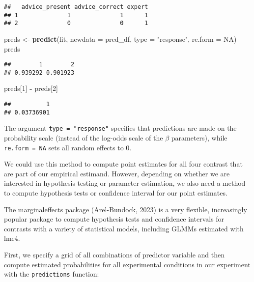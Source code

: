 \documentclass[
  man,floatsintext]{apa6}
\newenvironment{Shaded}{\begin{snugshade}}{\end{snugshade}}
\newcommand{\AttributeTok}[1]{\textcolor[rgb]{0.13,0.29,0.53}{#1}}
\newcommand{\ConstantTok}[1]{\textcolor[rgb]{0.56,0.35,0.01}{#1}}
\newcommand{\DecValTok}[1]{\textcolor[rgb]{0.00,0.00,0.81}{#1}}
\newcommand{\FunctionTok}[1]{\textcolor[rgb]{0.13,0.29,0.53}{\textbf{#1}}}
\newcommand{\NormalTok}[1]{#1}
\newcommand{\OtherTok}[1]{\textcolor[rgb]{0.56,0.35,0.01}{#1}}
\newcommand{\SpecialCharTok}[1]{\textcolor[rgb]{0.81,0.36,0.00}{\textbf{#1}}}
\newcommand{\StringTok}[1]{\textcolor[rgb]{0.31,0.60,0.02}{#1}}
\begin{document}
\begin{verbatim}
##   advice_present advice_correct expert
## 1              1              1      1
## 2              0              0      1
\end{verbatim}

\begin{Shaded}
\begin{Highlighting}[]
\NormalTok{preds }\OtherTok{\textless{}{-}} \FunctionTok{predict}\NormalTok{(fit, }\AttributeTok{newdata =}\NormalTok{ pred\_df, }\AttributeTok{type =} \StringTok{"response"}\NormalTok{, }\AttributeTok{re.form =} \ConstantTok{NA}\NormalTok{)}
\NormalTok{preds}
\end{Highlighting}
\end{Shaded}

\begin{verbatim}
##        1        2 
## 0.939292 0.901923
\end{verbatim}

\begin{Shaded}
\begin{Highlighting}[]
\NormalTok{preds[}\DecValTok{1}\NormalTok{] }\SpecialCharTok{{-}}\NormalTok{ preds[}\DecValTok{2}\NormalTok{]}
\end{Highlighting}
\end{Shaded}

\begin{verbatim}
##          1 
## 0.03736901
\end{verbatim}

The argument \texttt{type\ =\ "response"} specifies that predictions are made on the probability scale (instead of the log-odds scale of the \(\beta\) parameters), while \texttt{re.form\ =\ NA} sets all random effects to 0.

We could use this method to compute point estimates for all four contrast that are part of our empirical estimand.
However, depending on whether we are interested in hypothesis testing or parameter estimation, we also need a method to compute hypothesis tests or confidence interval for our point estimates.

The marginaleffects package (Arel-Bundock, 2023) is a very flexible, increasingly popular package to compute hypothesis tests and confidence intervals for contrasts with a variety of statistical models, including GLMMs estimated with lme4.

First, we specify a grid of all combinations of predictor variable and then compute estimated probabilities for all experimental conditions in our experiment with the \texttt{predictions} function:
\end{document}
